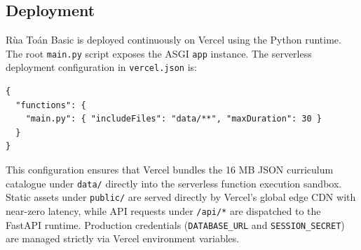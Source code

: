 \subsection{Deployment}
Rùa Toán Basic is deployed continuously on Vercel using the Python runtime. The root \texttt{main.py} script
exposes the ASGI \texttt{app} instance. The serverless deployment configuration in \texttt{vercel.json} is:
\begin{lstlisting}[numbers=none]
{
  "functions": {
    "main.py": { "includeFiles": "data/**", "maxDuration": 30 }
  }
}
\end{lstlisting}
This configuration ensures that Vercel bundles the 16 MB JSON curriculum catalogue under \texttt{data/} directly
into the serverless function execution sandbox. Static assets under \texttt{public/} are served directly by Vercel's
global edge CDN with near-zero latency, while API requests under \texttt{/api/*} are dispatched to the FastAPI
runtime. Production credentials (\texttt{DATABASE\_URL} and \texttt{SESSION\_SECRET}) are managed strictly via
Vercel environment variables.
